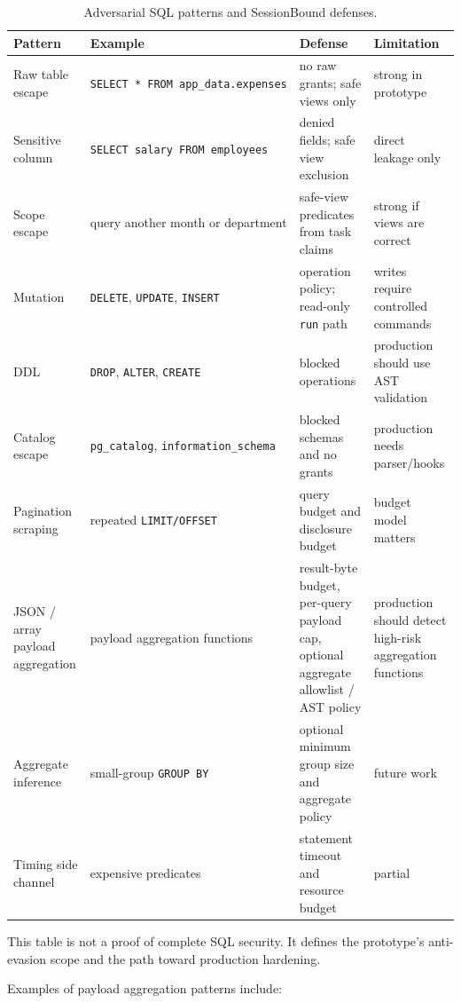 \documentclass[
]{article}
\begin{document}
\begin{table}[p]
\centering
\scriptsize
\caption{Adversarial SQL patterns and SessionBound defenses.}
\label{tab:anti-evasion}
\begin{tabular}{@{}
  >{\raggedright\arraybackslash}p{}
  >{\raggedright\arraybackslash}p{}
  >{\raggedright\arraybackslash}p{}
  >{\raggedright\arraybackslash}p{}@{}}
\toprule
Pattern & Example & Defense & Limitation \\
\midrule
Raw table escape & \texttt{SELECT\ *\ FROM\ app\_data.expenses} & no raw
grants; safe views only & strong in prototype \\
Sensitive column & \texttt{SELECT\ salary\ FROM\ employees} & denied
fields; safe view exclusion & direct leakage only \\
Scope escape & query another month or department & safe-view predicates
from task claims & strong if views are correct \\
Mutation & \texttt{DELETE}, \texttt{UPDATE}, \texttt{INSERT} & operation
policy; read-only \texttt{run} path & writes require controlled
commands \\
DDL & \texttt{DROP}, \texttt{ALTER}, \texttt{CREATE} & blocked
operations & production should use AST validation \\
Catalog escape & \texttt{pg\_catalog}, \texttt{information\_schema} &
blocked schemas and no grants & production needs parser/hooks \\
Pagination scraping & repeated \texttt{LIMIT/OFFSET} & query budget and
disclosure budget & budget model matters \\
JSON / array payload aggregation & payload aggregation functions &
result-byte budget, per-query payload cap, optional aggregate allowlist
/ AST policy & production should detect high-risk aggregation
functions \\
Aggregate inference & small-group \texttt{GROUP\ BY} & optional minimum
group size and aggregate policy & future work \\
Timing side channel & expensive predicates & statement timeout and
resource budget & partial \\
\bottomrule
\end{tabular}
\end{table}

This table is not a proof of complete SQL security. It defines the
prototype's anti-evasion scope and the path toward production hardening.

Examples of payload aggregation patterns include:
\end{document}
